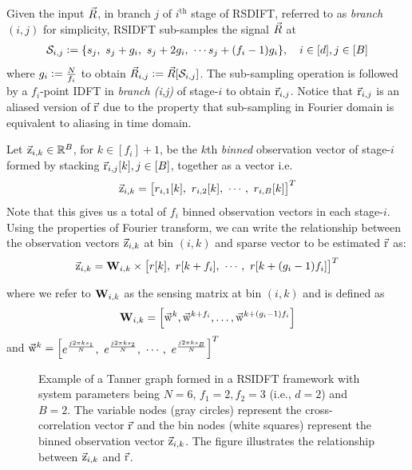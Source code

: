 	 Given the input $\vec{R}$, in branch $j$ of $i^{\text{th}}$ stage of RSDIFT, referred to as \textit{branch $(i,j)$} for simplicity, RSIDFT sub-samples the signal $\vec{R}$ at
\begin{align}
\label{Eqn:SamplingSets}
	 \mathcal{S}_{i,j} \mathrel{\mathop:}= \{s_j,\ s_j + g_i,\ s_j + 2g_i,\ \cdots s_j + (f_i-1) g_i\}, \quad i\in[d], j\in[B]
\end{align}
where $g_i\mathrel{\mathop:}= \frac{N}{f_i}$ to obtain $\vec{R}_{i,j}\mathrel{\mathop:}=\vec{R}[\mathcal{S}_{i,j}]$. The sub-sampling operation is followed by a $f_i$-point IDFT in \textit{branch (i,j)} of stage-$i$ to obtain $ \vec{\mathrm{r}}_{i,j}$. Notice that $ \vec{\mathrm{r}}_{i,j}$ is an aliased version of $\vec{\mathrm{r}}$ due to the property that sub-sampling in Fourier domain is equivalent to aliasing in time domain.

	 Let $\vec{\mathrm{z}}_{i,k}\in\mathbb{R}^{B}$, for $k\in [f_i]+1$, be the $k$th \textit{binned} observation vector of stage-$i$ formed by stacking $\vec{\mathrm{r}}_{i,j}[k], j\in[B]$, together as a vector i.e.
\[
	  \vec{\mathrm{z}}_{i,k} = \begin{bmatrix}
	 r_{i,1}[k],~ 
	 r_{i,2}[k],~ 
	 \cdots,~
	 r_{i,B}[k]
	 \end{bmatrix}^{T}
\]
Note that this gives us a total of $f_i$ binned observation vectors in each stage-$i$. Using the properties of Fourier transform, we can write the relationship between the observation vectors $\vec{\mathrm{z}}_{i,k}$ at bin $(i,k)$ and sparse vector to be estimated $\vec{\mathrm{r}}$ as: 
\begin{align}
	\label{Eqn:Generator Equation}
	\vec{\mathrm{z}}_{i,k}= \mathbf{W}_{i,k} \times
	\begin{bmatrix}
		r[k],~
		r[k+f_i],~
		\cdots,~
		r[k+(g_i-1)f_i]
	\end{bmatrix}^{T}
\end{align}

where we refer to $\mathbf{W}_{i,k}$ as the sensing matrix at bin $(i,k)$ and is defined as
\begin{align}\label{Eqn:Sensing Matrix}
	\mathbf{W}_{i,k} = \left[\vec{\mathrm{w}}^{k},\vec{\mathrm{w}}^{k+f_i},\ldots, \vec{\mathrm{w}}^{k+(g_i-1)f_i}\right]
\end{align} and
 $\vec{\mathrm{w}}^{k}=
	\begin{bmatrix}
		e^{\frac{j2\pi ks_1}{N}}, ~
		e^{\frac{j2\pi ks_2}{N}},~
		\cdots,~
		e^{\frac{j2\pi ks_B}{N}}
	\end{bmatrix}^{T}$

\begin{figure}[h!]
	\begin{center}
	 	\resizebox{0.70\textwidth}{!}{}	
	\end{center}	
	\caption{Example of a Tanner graph formed in a RSIDFT framework with system parameters being $N=6$, $f_1=2, f_2=3$ (i.e., $d=2$) and $B=2$. The variable nodes (gray circles) represent the cross-correlation vector $\vec{\mathrm{r}}$ and the bin nodes (white squares) represent the binned observation vector $\vec{\mathrm{z}}_{i,k}$. The figure illustrates the relationship between $\vec{\mathrm{z}}_{i,k}$ and $\vec{\mathrm{r}}$.}\label{fig:factorgraph}
	\vspace{5 pt}
\end{figure}
 
